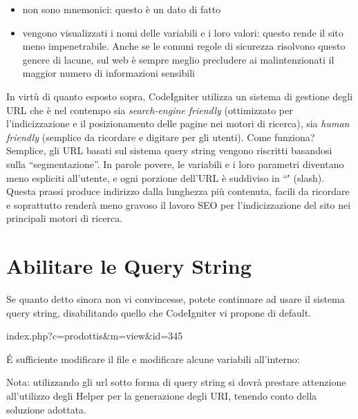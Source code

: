 \begin{itemize}
\item non sono mnemonici: questo è un dato di fatto
\item vengono visualizzati i nomi delle variabili e i loro valori: questo rende il sito meno impenetrabile. Anche se le comuni regole di sicurezza risolvono questo genere di lacune, sul web è sempre meglio precludere ai malintenzionati il maggior numero di informazioni sensibili
\end{itemize}

In virtù di quanto esposto sopra, CodeIgniter utilizza un sistema di gestione degli \ac{URL} che è nel contempo sia \emph{search-engine friendly} (ottimizzato per l'indicizzazione e il posizionamento delle pagine nei motori di ricerca), sia \emph{human friendly} (semplice da ricordare e digitare per gli utenti). Come funziona? Semplice, gli \ac{URL} basati sul sistema query string vengono riscritti basandosi sulla ``segmentazione''. In parole povere, le variabili e i loro parametri diventano meno espliciti all'utente, e ogni porzione dell'\ac{URL} è suddiviso in ``\'' (slash). Questa prassi produce indirizzo dalla lunghezza più contenuta, facili da ricordare e soprattutto renderà meno gravoso il lavoro SEO per l'indicizzazione del sito nei principali motori di ricerca.

\section{Abilitare le Query String}
Se quanto detto sinora non vi convincesse, potete continuare ad usare il sistema query string, disabilitando quello che CodeIgniter vi propone di default.

\begin{codef}
index.php?c=prodottis&m=view&id=345
\end{codef}

\'E sufficiente modificare il file  e modificare alcune variabili all'interno:


Nota: utilizzando gli url sotto forma di query string si dovrà prestare attenzione all'utilizzo degli Helper per la generazione degli \ac{URI}, tenendo conto della soluzione adottata.

